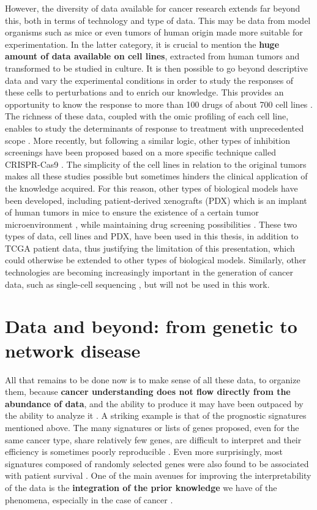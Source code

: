 \documentclass[a4paper,12pt,twoside,onecolumn,openright,final,oldfontcommands]{memoir}
\begin{document}
However, the diversity of data available for cancer research extends far
beyond this, both in terms of technology and type of data. This may be
data from model organisms such as mice or even tumors of human origin
made more suitable for experimentation. In the latter category, it is
crucial to mention the \textbf{huge amount of data available on cell
lines}, extracted from human tumors and transformed to be studied in
culture. It is then possible to go beyond descriptive data and vary the
experimental conditions in order to study the responses of these cells
to perturbations and to enrich our knowledge. This provides an
opportunity to know the response to more than 100 drugs of about 700
cell lines \citep{yang2012genomics}. The richness of these data, coupled
with the omic profiling of each cell line, enables to study the
determinants of response to treatment with unprecedented scope
\citep{iorio2016landscape}. More recently, but following a similar
logic, other types of inhibition screenings have been proposed based on
a more specific technique called CRISPR-Cas9
\citep{behan2019prioritization}. The simplicity of the cell lines in
relation to the original tumors makes all these studies possible but
sometimes hinders the clinical application of the knowledge acquired.
For this reason, other types of biological models have been developed,
including patient-derived xenografts (PDX) which is an implant of human
tumors in mice to ensure the existence of a certain tumor
microenvironment \citep{hidalgo2014patient}, while maintaining drug
screening possibilities \citep{gao2015high}. These two types of data,
cell lines and PDX, have been used in this thesis, in addition to TCGA
patient data, thus justifying the limitation of this presentation, which
could otherwise be extended to other types of biological models.
Similarly, other technologies are becoming increasingly important in the
generation of cancer data, such as single-cell sequencing
\citep{navin2015first}, but will not be used in this work.

\section{Data and beyond: from genetic to network
disease}\label{data-and-beyond-from-genetic-to-network-disease}

All that remains to be done now is to make sense of all these data, to
organize them, because \textbf{cancer understanding does not flow
directly from the abundance of data}, and the ability to produce it may
have been outpaced by the ability to analyze it
\citep{stadler2014cancer}. A striking example is that of the prognostic
signatures mentioned above. The many signatures or lists of genes
proposed, even for the same cancer type, share relatively few genes, are
difficult to interpret and their efficiency is sometimes poorly
reproducible \citep{domany2014using}. Even more surprisingly, most
signatures composed of randomly selected genes were also found to be
associated with patient survival \citep{venet2011most}. One of the main
avenues for improving the interpretability of the data is the
\textbf{integration of the prior knowledge} we have of the phenomena,
especially in the case of cancer \citep{domany2014using}.
\end{document}
